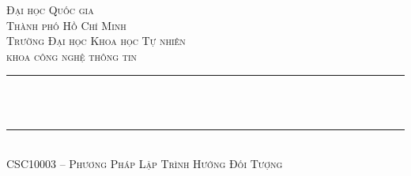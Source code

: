 \thispagestyle{empty}
\begin{titlepage}
	\begin{center}
		\makeatletter
		\newcommand{\HRule}{\rule{\linewidth}{0.4mm}}

		\textsc{\LARGE Đại học Quốc gia\\Thành phố Hồ Chí Minh}\\[1.5cm]
		\textsc{\Large Trường Đại học Khoa học Tự nhiên}\\[0.5cm]
		\textsc{\Large khoa công nghệ thông tin}\\[1.5cm]

		{\HRule}\\[1cm]
		{\huge \bfseries \@title}\\[0.5cm]
		{\HRule}\\[2cm]

		\textsc{\large CSC10003 -- Phương Pháp Lập Trình Hướng Đối Tượng}\\[0.5cm]

		\vfill\vfill\vfill

		{\large \@author}\\[1.5cm]
		{\large \@date}
		\makeatother
	\end{center}
\end{titlepage}
